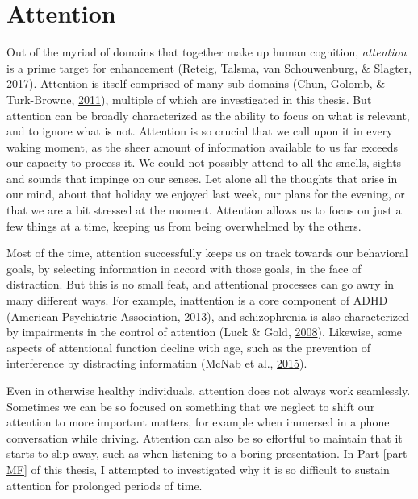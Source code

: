 \documentclass[12pt,a4paper,oldfontcommands]{memoir}
\begin{document}
\hypertarget{attention}{%
\section{Attention}\label{attention}}

Out of the myriad of domains that together make up human cognition, \emph{attention} is a prime target for enhancement (Reteig, Talsma, van Schouwenburg, \& Slagter, \protect\hyperlink{ref-Reteig2017}{2017}). Attention is itself comprised of many sub-domains (Chun, Golomb, \& Turk-Browne, \protect\hyperlink{ref-Chun2011}{2011}), multiple of which are investigated in this thesis. But attention can be broadly characterized as the ability to focus on what is relevant, and to ignore what is not. Attention is so crucial that we call upon it in every waking moment, as the sheer amount of information available to us far exceeds our capacity to process it. We could not possibly attend to all the smells, sights and sounds that impinge on our senses. Let alone all the thoughts that arise in our mind, about that holiday we enjoyed last week, our plans for the evening, or that we are a bit stressed at the moment. Attention allows us to focus on just a few things at a time, keeping us from being overwhelmed by the others.

Most of the time, attention successfully keeps us on track towards our behavioral goals, by selecting information in accord with those goals, in the face of distraction. But this is no small feat, and attentional processes can go awry in many different ways. For example, inattention is a core component of ADHD (American Psychiatric Association, \protect\hyperlink{ref-AmericanPsychiatricAssociation2013}{2013}), and schizophrenia is also characterized by impairments in the control of attention (Luck \& Gold, \protect\hyperlink{ref-Luck2008}{2008}). Likewise, some aspects of attentional function decline with age, such as the prevention of interference by distracting information (McNab et al., \protect\hyperlink{ref-McNab2015}{2015}).

Even in otherwise healthy individuals, attention does not always work seamlessly. Sometimes we can be so focused on something that we neglect to shift our attention to more important matters, for example when immersed in a phone conversation while driving. Attention can also be so effortful to maintain that it starts to slip away, such as when listening to a boring presentation. In Part \ref{part-MF} of this thesis, I attempted to investigated why it is so difficult to sustain attention for prolonged periods of time.
\end{document}
